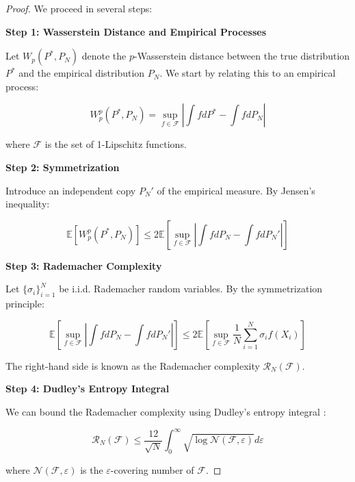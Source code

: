 \documentclass[11pt, oneside]{article}
\begin{document}
\begin{proof}
We proceed in several steps:

\textbf{Step 1: Wasserstein Distance and Empirical Processes}

Let $W_p(P^*, P_N)$ denote the $p$-Wasserstein distance between the true distribution $P^*$ and the empirical distribution $P_N$. We start by relating this to an empirical process:

\begin{equation}
    W_p^p(P^*, P_N) = \sup_{f \in \mathcal{F}} \left|\int f dP^* - \int f dP_N\right|
\end{equation}

where $\mathcal{F}$ is the set of 1-Lipschitz functions.

\textbf{Step 2: Symmetrization}

Introduce an independent copy $P_N'$ of the empirical measure. By Jensen's inequality:

\begin{equation}
    \mathbb{E}[W_p^p(P^*, P_N)] \leq 2\mathbb{E}\left[\sup_{f \in \mathcal{F}} \left|\int f dP_N - \int f dP_N'\right|\right]
\end{equation}

\textbf{Step 3: Rademacher Complexity}

Let $\{\sigma_i\}_{i=1}^N$ be i.i.d. Rademacher random variables. By the symmetrization principle:

\begin{equation}
    \mathbb{E}\left[\sup_{f \in \mathcal{F}} \left|\int f dP_N - \int f dP_N'\right|\right] \leq 2\mathbb{E}\left[\sup_{f \in \mathcal{F}} \frac{1}{N}\sum_{i=1}^N \sigma_i f(X_i)\right]
\end{equation}

The right-hand side is known as the Rademacher complexity $\mathcal{R}_N(\mathcal{F})$.

\textbf{Step 4: Dudley's Entropy Integral}

We can bound the Rademacher complexity using Dudley's entropy integral \cite{kakade2008complexity}:

\begin{equation}
    \mathcal{R}_N(\mathcal{F}) \leq \frac{12}{\sqrt{N}} \int_0^\infty \sqrt{\log \mathcal{N}(\mathcal{F}, \varepsilon)} d\varepsilon
\end{equation}

where $\mathcal{N}(\mathcal{F}, \varepsilon)$ is the $\varepsilon$-covering number of $\mathcal{F}$.


\end{proof}
\end{document}
